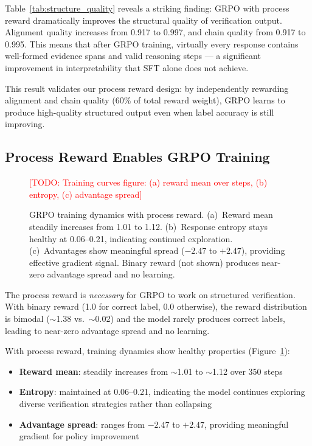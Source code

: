 \documentclass{article}
\newcommand{\todo}[1]{\textcolor{red}{[TODO: #1]}}
\begin{document}
Table~\ref{tab:structure_quality} reveals a striking finding: GRPO with process reward dramatically improves the structural quality of verification output.
Alignment quality increases from 0.917 to 0.997, and chain quality from 0.917 to 0.995.
This means that after GRPO training, virtually every response contains well-formed evidence spans and valid reasoning steps --- a significant improvement in interpretability that SFT alone does not achieve.

This result validates our process reward design: by independently rewarding alignment and chain quality (60\% of total reward weight), GRPO learns to produce high-quality structured output even when label accuracy is still improving.


\subsection{Process Reward Enables GRPO Training}

\begin{figure}[t]
\centering
\todo{Training curves figure: (a) reward mean over steps, (b) entropy, (c) advantage spread}
\caption{GRPO training dynamics with process reward. (a)~Reward mean steadily increases from 1.01 to 1.12. (b)~Response entropy stays healthy at 0.06--0.21, indicating continued exploration. (c)~Advantages show meaningful spread ($-2.47$ to $+2.47$), providing effective gradient signal. Binary reward (not shown) produces near-zero advantage spread and no learning.}
\label{fig:training_dynamics}
\end{figure}

The process reward is \emph{necessary} for GRPO to work on structured verification.
With binary reward (1.0 for correct label, 0.0 otherwise), the reward distribution is bimodal ($\sim$1.38 vs.\ $\sim$0.02) and the model rarely produces correct labels, leading to near-zero advantage spread and no learning.

With process reward, training dynamics show healthy properties (Figure~\ref{fig:training_dynamics}):
\begin{itemize}[nosep,leftmargin=*]
  \item \textbf{Reward mean}: steadily increases from $\sim$1.01 to $\sim$1.12 over 350 steps
  \item \textbf{Entropy}: maintained at 0.06--0.21, indicating the model continues exploring diverse verification strategies rather than collapsing
  \item \textbf{Advantage spread}: ranges from $-2.47$ to $+2.47$, providing meaningful gradient for policy improvement
\end{itemize}
\end{document}
